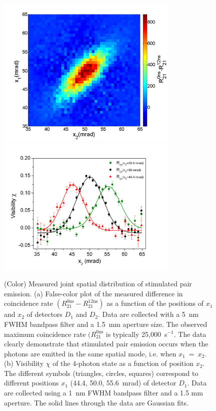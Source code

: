 \begin{figure}[tbp]
\centering \includegraphics[width=87mm]{Fig3a.png} \\
\centering \includegraphics[width=87mm]{Fig3b.png}
\caption{(Color) Measured joint spatial distribution of stimulated pair emission. (a) False-color plot of the measured difference in coincidence rate $(R_{21}^{0\mathrm{ns}} - R_{21}^{12\mathrm{ns}})$  as a function of the positions of $x_1$ and $x_2$ of detectors $D_1$ and $D_2$. Data are collected with a 5~nm FWHM bandpass filter and a 1.5~mm aperture size. The observed maximum coincidence rate $(R_{21}^{0\mathrm{ns}}$ is typically 25,000~s$^{-1}$. The data clearly demonstrate that stimulated pair emission occurs when the photons are emitted in the same spatial mode, i.e. when $x_1$~=~$x_2$. (b) Visibility $\chi$ of the 4-photon state as a function of position $x_2$. The different symbols (triangles, circles, squares) correspond to different positions $x_1$ (44.4, 50.0, 55.6~mrad) of detector $D_1$. Data are collected using a 1~nm FWHM bandpass filter and a 1.5 mm aperture. The solid lines through the data are Gaussian fits.}\label{Fig:4photon}
\end{figure}

